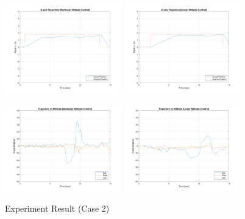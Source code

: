 \begin{figure}
    \includegraphics[width=0.45\textwidth]{graphics/experiment_plots/roll_plus_non_position_z.png}
    \includegraphics[width=0.45\textwidth]{graphics/experiment_plots/roll_plus_pid_position_z.png}

    \includegraphics[width=0.45\textwidth]{graphics/experiment_plots/roll_plus_non_attitude.png}
    \includegraphics[width=0.45\textwidth]{graphics/experiment_plots/roll_plus_pid_attitude.png}
    \caption{Experiment Result (Case 2)}
    \label{fig:exp_roll_plus}
\end{figure}

